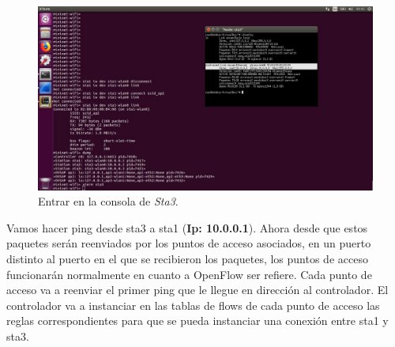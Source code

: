 \begin{figure}[!htb]
  \centering
    \includegraphics[width=\linewidth]{./img/test/14.JPG}
    \caption{Entrar en la consola de \textit{Sta3}.}
  \label{fig:yo}
\end{figure}
\newline
Vamos hacer ping desde sta3 a sta1 (\textbf{Ip: 10.0.0.1}). Ahora desde que estos paquetes serán reenviados por los puntos de acceso asociados, en un puerto distinto al puerto
en el que se recibieron los paquetes, los puntos de acceso funcionarán normalmente en cuanto a OpenFlow ser refiere. Cada punto de acceso va a reenviar el primer ping que le llegue en dirección al controlador. El controlador va a instanciar en las tablas de flows de cada punto de acceso las reglas correspondientes para que se pueda instanciar una conexión entre sta1 y sta3. \newline

